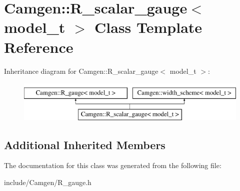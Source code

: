 \hypertarget{a00465}{}\section{Camgen\+:\+:R\+\_\+scalar\+\_\+gauge$<$ model\+\_\+t $>$ Class Template Reference}
\label{a00465}
Inheritance diagram for Camgen\+:\+:R\+\_\+scalar\+\_\+gauge$<$ model\+\_\+t $>$\+:\begin{figure}[H]
\begin{center}
\leavevmode
\includegraphics[height=2.000000cm]{a00465}
\end{center}
\end{figure}
\subsection*{Additional Inherited Members}


The documentation for this class was generated from the following file\+:\begin{DoxyCompactItemize}
\item 
include/\+Camgen/R\+\_\+gauge.\+h\end{DoxyCompactItemize}
